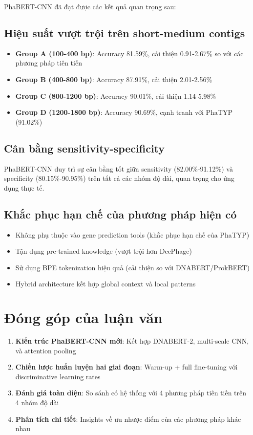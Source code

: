 PhaBERT-CNN đã đạt được các kết quả quan trọng sau:

\subsection{Hiệu suất vượt trội trên short-medium contigs}

\begin{itemize}
    \item \textbf{Group A (100-400 bp)}: Accuracy 81.59\%, cải thiện 0.91-2.67\% so với các phương pháp tiên tiến
    \item \textbf{Group B (400-800 bp)}: Accuracy 87.91\%, cải thiện 2.01-2.56\%
    \item \textbf{Group C (800-1200 bp)}: Accuracy 90.01\%, cải thiện 1.14-5.98\%
    \item \textbf{Group D (1200-1800 bp)}: Accuracy 90.69\%, cạnh tranh với PhaTYP (91.02\%)
\end{itemize}

\subsection{Cân bằng sensitivity-specificity}

PhaBERT-CNN duy trì sự cân bằng tốt giữa sensitivity (82.00\%-91.12\%) và specificity (80.15\%-90.95\%) trên tất cả các nhóm độ dài, quan trọng cho ứng dụng thực tế.

\subsection{Khắc phục hạn chế của phương pháp hiện có}

\begin{itemize}
    \item Không phụ thuộc vào gene prediction tools (khắc phục hạn chế của PhaTYP)
    \item Tận dụng pre-trained knowledge (vượt trội hơn DeePhage)
    \item Sử dụng BPE tokenization hiệu quả (cải thiện so với DNABERT/ProkBERT)
    \item Hybrid architecture kết hợp global context và local patterns
\end{itemize}

\section{Đóng góp của luận văn}

\begin{enumerate}
    \item \textbf{Kiến trúc PhaBERT-CNN mới}: Kết hợp DNABERT-2, multi-scale CNN, và attention pooling
    \item \textbf{Chiến lược huấn luyện hai giai đoạn}: Warm-up + full fine-tuning với discriminative learning rates
    \item \textbf{Đánh giá toàn diện}: So sánh có hệ thống với 4 phương pháp tiên tiến trên 4 nhóm độ dài
    \item \textbf{Phân tích chi tiết}: Insights về ưu nhược điểm của các phương pháp khác nhau
\end{enumerate}

